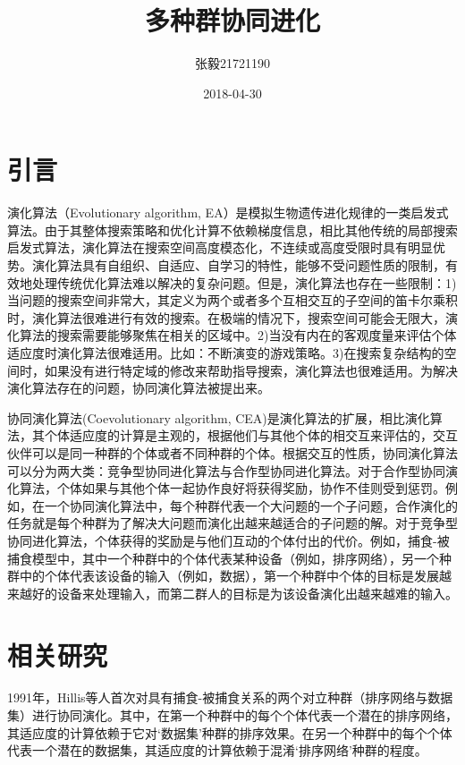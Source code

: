 \documentclass[a4paper]{article}
\title{多种群协同进化}
\date{2018-04-30}
\author{张毅\hspace{1em}21721190}
\begin{document}
    
    \maketitle


    \newpage
    \tableofcontents
    

    \newpage
    \section{引言}

    演化算法（Evolutionary algorithm, EA）是模拟生物遗传进化规律的一类启发式算法。由于其整体搜索策略和优化计算不依赖梯度信息，相比其他传统的局部搜索启发式算法，演化算法在搜索空间高度模态化，不连续或高度受限时具有明显优势。演化算法具有自组织、自适应、自学习的特性，能够不受问题性质的限制，有效地处理传统优化算法难以解决的复杂问题\cite{sun_ea}。但是，演化算法也存在一些限制：1)当问题的搜索空间非常大，其定义为两个或者多个互相交互的子空间的笛卡尔乘积时，演化算法很难进行有效的搜索。在极端的情况下，搜索空间可能会无限大，演化算法的搜索需要能够聚焦在相关的区域中。2)当没有内在的客观度量来评估个体适应度时演化算法很难适用。比如：不断演变的游戏策略。3)在搜索复杂结构的空间时，如果没有进行特定域的修改来帮助指导搜索，演化算法也很难适用。为解决演化算法存在的问题，协同演化算法被提出来。
    
    协同演化算法(Coevolutionary algorithm, CEA)是演化算法的扩展，相比演化算法，其个体适应度的计算是主观的，根据他们与其他个体的相交互来评估的，交互伙伴可以是同一种群的个体或者不同种群的个体\cite{wiegand2003analysis}。根据交互的性质，协同演化算法可以分为两大类：竞争型协同进化算法与合作型协同进化算法。对于合作型协同演化算法，个体如果与其他个体一起协作良好将获得奖励，协作不佳则受到惩罚。例如，在一个协同演化算法中，每个种群代表一个大问题的一个子问题，合作演化的任务就是每个种群为了解决大问题而演化出越来越适合的子问题的解。对于竞争型协同进化算法，个体获得的奖励是与他们互动的个体付出的代价。例如，捕食-被捕食模型中，其中一个种群中的个体代表某种设备（例如，排序网络），另一个种群中的个体代表该设备的输入（例如，数据），第一个种群中个体的目标是发展越来越好的设备来处理输入，而第二群人的目标是为该设备演化出越来越难的输入。


    \newpage
    \section{相关研究}
    
    1991年，Hillis等人首次对具有捕食-被捕食关系的两个对立种群（排序网络与数据集）进行协同演化\cite{hillis1990co}。其中，在第一个种群中的每个个体代表一个潜在的排序网络，其适应度的计算依赖于它对‘数据集’种群的排序效果。在另一个种群中的每个个体代表一个潜在的数据集，其适应度的计算依赖于混淆‘排序网络’种群的程度。
    
\end{document}
